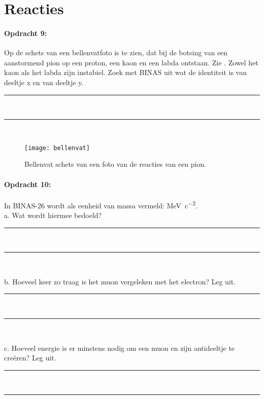 \section{Reacties}

\paragraph{Opdracht 9:}
Op de schets van een bellenvatfoto is te zien, dat bij de botsing van een 
aanstormend pion op een proton, een kaon en een labda ontstaan. Zie 
.
Zowel het kaon als het labda zijn instabiel.
Zoek met BINAS uit wat de identiteit is van deeltje x en van deeltje y.
\begin{center}
    \rule{\textwidth}{0.3mm}\\
    \rule{\textwidth}{0.3mm}\\
\end{center}

\begin{figure}[h]
    \centering
    \texttt{[image: bellenvat]}
    \caption{Bellenvat schets van een foto van de reacties van een pion.}
    \label{fig:bellenvat}
\end{figure}


\paragraph{Opdracht 10:}
In BINAS-26 wordt als eenheid van massa vermeld: \si{MeV.c^{-2}}.\\
a. Wat wordt hiermee bedoeld?
\begin{center}
    \rule{\textwidth}{0.3mm}\\
    \rule{\textwidth}{0.3mm}\\
\end{center}
b. Hoeveel keer zo traag is het muon vergeleken met het electron? Leg uit.
\begin{center}
    \rule{\textwidth}{0.3mm}\\
    \rule{\textwidth}{0.3mm}\\
\end{center}
c. Hoeveel energie is er minstens nodig om een muon en zijn antideeltje te 
creëren? Leg uit.
\begin{center}
    \rule{\textwidth}{0.3mm}\\
    \rule{\textwidth}{0.3mm}\\
\end{center}


